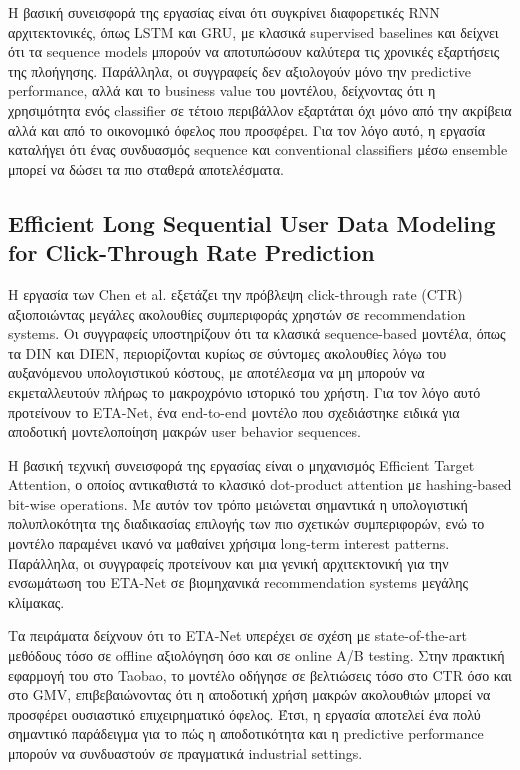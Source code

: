 \documentclass[12pt,a4paper]{article}
\begin{document}
	Η βασική συνεισφορά της εργασίας είναι ότι συγκρίνει διαφορετικές RNN αρχιτεκτονικές, όπως LSTM και GRU, με κλασικά supervised baselines και δείχνει ότι τα sequence models μπορούν να αποτυπώσουν καλύτερα τις χρονικές εξαρτήσεις της πλοήγησης. Παράλληλα, οι συγγραφείς δεν αξιολογούν μόνο την predictive performance, αλλά και το business value του μοντέλου, δείχνοντας ότι η χρησιμότητα ενός classifier σε τέτοιο περιβάλλον εξαρτάται όχι μόνο από την ακρίβεια αλλά και από το οικονομικό όφελος που προσφέρει. Για τον λόγο αυτό, η εργασία καταλήγει ότι ένας συνδυασμός sequence και conventional classifiers μέσω ensemble μπορεί να δώσει τα πιο σταθερά αποτελέσματα.
	
	
	\subsection{Efficient Long Sequential User Data Modeling for Click-Through Rate Prediction }
	
	
	Η εργασία των Chen et al. \cite{chen2022eta} εξετάζει την πρόβλεψη click-through rate (CTR) αξιοποιώντας μεγάλες ακολουθίες συμπεριφοράς χρηστών σε recommendation systems. Οι συγγραφείς υποστηρίζουν ότι τα κλασικά sequence-based μοντέλα, όπως τα DIN και DIEN, περιορίζονται κυρίως σε σύντομες ακολουθίες λόγω του αυξανόμενου υπολογιστικού κόστους, με αποτέλεσμα να μη μπορούν να εκμεταλλευτούν πλήρως το μακροχρόνιο ιστορικό του χρήστη. Για τον λόγο αυτό προτείνουν το ETA-Net, ένα end-to-end μοντέλο που σχεδιάστηκε ειδικά για αποδοτική μοντελοποίηση μακρών user behavior sequences.
	
	Η βασική τεχνική συνεισφορά της εργασίας είναι ο μηχανισμός Efficient Target Attention, ο οποίος αντικαθιστά το κλασικό dot-product attention με hashing-based bit-wise operations. Με αυτόν τον τρόπο μειώνεται σημαντικά η υπολογιστική πολυπλοκότητα της διαδικασίας επιλογής των πιο σχετικών συμπεριφορών, ενώ το μοντέλο παραμένει ικανό να μαθαίνει χρήσιμα long-term interest patterns. Παράλληλα, οι συγγραφείς προτείνουν και μια γενική αρχιτεκτονική για την ενσωμάτωση του ETA-Net σε βιομηχανικά recommendation systems μεγάλης κλίμακας.
	
	Τα πειράματα δείχνουν ότι το ETA-Net υπερέχει σε σχέση με state-of-the-art μεθόδους τόσο σε offline αξιολόγηση όσο και σε online A/B testing. Στην πρακτική εφαρμογή του στο Taobao, το μοντέλο οδήγησε σε βελτιώσεις τόσο στο CTR όσο και στο GMV, επιβεβαιώνοντας ότι η αποδοτική χρήση μακρών ακολουθιών μπορεί να προσφέρει ουσιαστικό επιχειρηματικό όφελος. Έτσι, η εργασία αποτελεί ένα πολύ σημαντικό παράδειγμα για το πώς η αποδοτικότητα και η predictive performance μπορούν να συνδυαστούν σε πραγματικά industrial settings.
	
\end{document}
